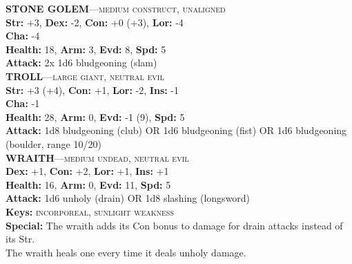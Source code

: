 \documentclass[letterpaper, 12pt, twocolumn]{book}
\def\linedivide{, }
\def\sectionheader#1{\textbf{#1: }}
\def\key#1{\textsc{#1}}
\begin{document}
 \RaggedRight\textbf{STONE GOLEM}---\key{medium construct, unaligned}\\\sectionheader{Str}+3\linedivide\sectionheader{Dex}-2\linedivide\sectionheader{Con}+0 (+3)\linedivide\sectionheader{Lor}-4\\\sectionheader{Cha}-4\\\sectionheader{Health}18\linedivide\sectionheader{Arm}3\linedivide\sectionheader{Evd}8\linedivide\sectionheader{Spd}5\\\sectionheader{Attack}2x 1d6 bludgeoning (slam)\\\bigskip\textbf{TROLL}---\key{large giant, neutral evil}\\\sectionheader{Str}+3 (+4)\linedivide\sectionheader{Con}+1\linedivide\sectionheader{Lor}-2\linedivide\sectionheader{Ins}-1\\\sectionheader{Cha}-1\\\sectionheader{Health}28\linedivide\sectionheader{Arm}0\linedivide\sectionheader{Evd}-1 (9)\linedivide\sectionheader{Spd}5\\\sectionheader{Attack}1d8 bludgeoning (club) OR 1d6 bludgeoning (fist) OR 1d6 bludgeoning (boulder, range 10/20)\\\bigskip\textbf{WRAITH}---\key{medium undead, neutral evil}\\\sectionheader{Dex}+1\linedivide\sectionheader{Con}+2\linedivide\sectionheader{Lor}+1\linedivide\sectionheader{Ins}+1\\\sectionheader{Health}16\linedivide\sectionheader{Arm}0\linedivide\sectionheader{Evd}11\linedivide\sectionheader{Spd}5\\\sectionheader{Attack}1d6 unholy (drain) OR 1d8 slashing (longsword)\\\sectionheader{Keys}\key{incorporeal, sunlight weakness}\\\sectionheader{Special}The wraith adds its Con bonus to damage for drain attacks instead of its Str.\\The wraith heals one every time it deals unholy damage.\\\bigskip
\end{document}
